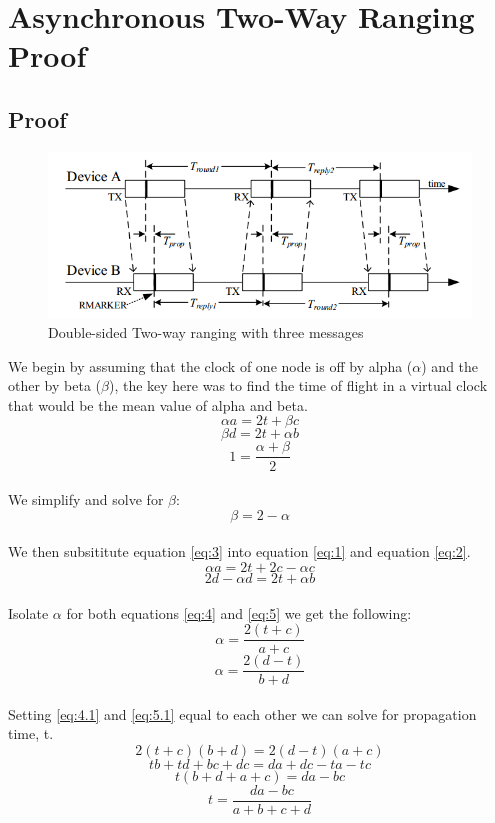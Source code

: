 
\chapter{Asynchronous Two-Way Ranging Proof} %

\label{AsyncProof} %

\section{Proof}
\begin{figure}
	\includegraphics[width=\linewidth]{tprop.png}
	\caption{Double-sided Two-way ranging with three messages}
\end{figure}

We begin by assuming that the clock of one node is off by alpha ($\alpha$) and the other by beta ($\beta$), the key here was to find the time of flight in a virtual clock that would be the mean value of alpha and beta.
\\
\[ \alpha a = 2t + \beta c  \tag{1} \label{eq:1} \]
\[ \beta d = 2t + \alpha b  \tag{2} \label{eq:2} \]
\[ 1 = \frac{\alpha + \beta}{2} \]
\\
We simplify and solve for $\beta$:
\\
\[ \beta = 2 - \alpha  \tag{3} \label{eq:3} \]
\\
We then subsititute equation \eqref{eq:3} into equation \eqref{eq:1} and equation \eqref{eq:2}.
\\
\[ \alpha a = 2t + 2c - \alpha c  \tag{4} \label{eq:4} \]
\[ 2d - \alpha d = 2t + \alpha b  \tag{5} \label{eq:5} \]
\\
Isolate $\alpha$ for both equations \eqref{eq:4} and \eqref{eq:5} we get the following:
\\
\[ \alpha = \frac{2(t + c)}{a + c}  \tag{4.1} \label{eq:4.1} \]
\[ \alpha = \frac{2(d - t)}{b + d}  \tag{5.1} \label{eq:5.1} \]
\\
Setting \eqref{eq:4.1} and \eqref{eq:5.1} equal to each other we can solve for propagation time, t.
\\
\[ 2(t + c)(b +d) = 2(d - t)(a + c)\]
\[ tb + td +bc + dc = da + dc - ta - tc \]
\[ t(b + d + a + c) = da - bc\]
\[ t = \frac{da-bc}{a + b + c + d}  \tag{6} \label{eq:6} \]
\\

